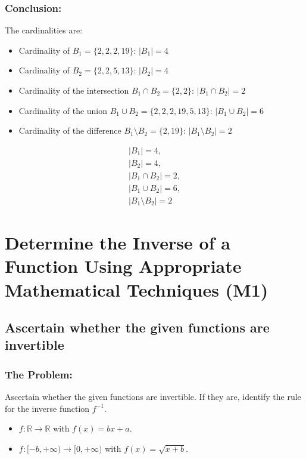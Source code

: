 \documentclass[12pt, a4paper, twoside]{report} %
\begin{document}
\subsubsection*{Conclusion:}
The cardinalities are:
\begin{itemize}
  \item Cardinality of \( B_1 = \{2, 2, 2, 19\} \): \( |B_1| = 4 \)
  \item Cardinality of \( B_2 = \{2, 2, 5, 13\} \): \( |B_2| = 4 \)
  \item Cardinality of the intersection \( B_1 \cap B_2 = \{2, 2\} \): \( |B_1 \cap B_2| = 2 \)
  \item Cardinality of the union \( B_1 \cup B_2 = \{2, 2, 2, 19, 5, 13\} \): \( |B_1 \cup B_2| = 6 \)
  \item Cardinality of the difference \( B_1 \setminus B_2 = \{2, 19\} \): \( |B_1 \setminus B_2| = 2 \)
\end{itemize}
\[
\boxed{
\begin{array}{l}
|B_1| = 4, \\
|B_2| = 4, \\
|B_1 \cap B_2| = 2, \\
|B_1 \cup B_2| = 6, \\
|B_1 \setminus B_2| = 2
\end{array}
}
\]

\section{Determine the Inverse of a Function Using Appropriate Mathematical Techniques (M1)}
\label{sec:M1}

\subsection{Ascertain whether the given functions are invertible}

\subsubsection*{The Problem:}
Ascertain whether the given functions are invertible. If they are, identify the rule for the inverse function \( f^{-1} \).
\begin{itemize}
  \item \( f: \mathbb{R} \rightarrow \mathbb{R} \) with \( f(x) = bx + a \).
  \item \( f: [-b, +\infty) \rightarrow [0, +\infty) \) with \( f(x) = \sqrt{x + b} \).
\end{itemize}
\end{document}
